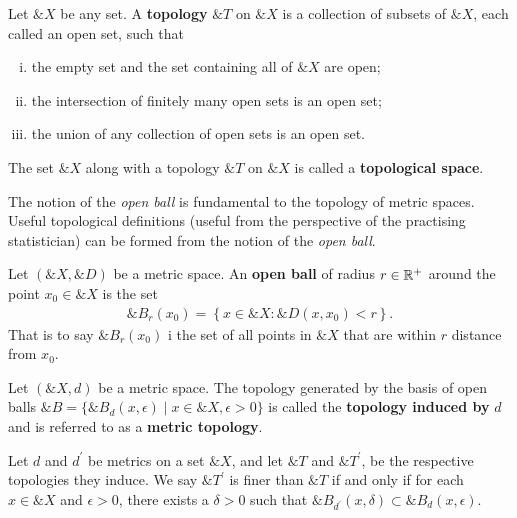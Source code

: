 \begin{definition}
  Let $\&X$ be any set. A \textbf{topology} $\&T$ on $\&X$ is a
  collection of subsets of $\&X$, each called an open set, such that
  \begin{enumerate}[(i)]
  \item the empty set and the set containing all of $\&X$ are open;
  \item the intersection of finitely many open sets is an open set;
  \item the union of any collection of open sets is an open set.
  \end{enumerate} The set $\&X$ along with a topology $\&T$ on $\&X$
  is called a \textbf{topological space}.
\end{definition}

The notion of the \textit{open ball} is fundamental to the topology of metric
spaces.  Useful topological definitions (useful from the perspective
of the practising statistician) can be formed from the notion of the
\textit{open ball}.

\begin{definition}
  Let $(\&X, \&D)$ be a metric space. An \textbf{open ball} of radius
  $r \in \mathbb{R}^+$ around the point $x_0 \in \&X$ is the set
  \begin{align}
    \&B_r(x_0) = \left\{ x \in \&X : \&D(x,x_0) < r \right\}.
  \end{align}
  That is to say $\&B_r(x_0)$ i the set of all points in $\&X$ that
  are within $r$ distance from $x_0$.
\end{definition}

\begin{definition}
  \label{def:topology}
  Let $(\&X, d)$ be a metric space.  The topology generated by the
  basis of open balls
  $\&B = \{\&B_d(x, \epsilon) \mid x \in \&X, \epsilon > 0\}$ is
  called the \textbf{topology induced by} $d$ and is referred to as a
  \textbf{metric topology}.
\end{definition}

\begin{theorem}
  Let $d$ and $d^\prime$ be metrics on  a set $\&X$, and let $\&T$ and
  $\&T^\prime$,  be the  respective  topologies they  induce.  We  say
  $\&T^\prime$ is finer than $\&T$ if and only if for each $x \in \&X$
  and  $\epsilon  >  0$,  there  exists  a  $\delta  >  0$  such  that
  $\&B_{d^\prime}(x, \delta) \subset \&B_d(x, \epsilon)$.
\end{theorem}



